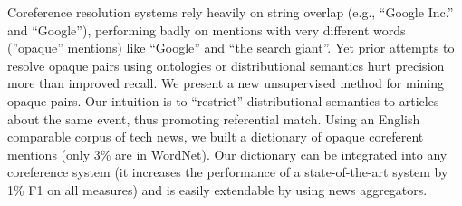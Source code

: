 Coreference resolution systems rely heavily on string overlap (e.g., ``Google Inc.'' and ``Google''), performing badly on mentions with very different words
 (''opaque'' mentions) like ``Google'' and ``the search giant''. Yet prior attempts to
 resolve opaque pairs using ontologies or distributional semantics hurt
 precision more than improved recall. We present a new unsupervised method for
 mining opaque pairs. Our intuition is to ``restrict'' distributional semantics to
 articles about the same event, thus promoting referential match. Using an
 English comparable corpus of tech news, we built a dictionary of opaque
 coreferent mentions (only 3\% are in WordNet). Our dictionary can be integrated
 into any coreference system (it increases the performance of a state-of-the-art
 system by 1\% F1 on all measures) and is easily extendable by using news
 aggregators.

